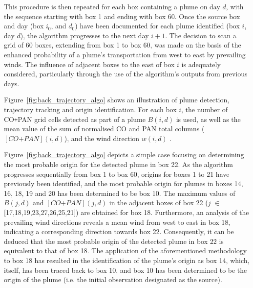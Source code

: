 \documentclass[acp, manuscript]{copernicus}
\begin{document}
This procedure is then repeated for each box containing a plume on day $d$, with the sequence starting with box 1 and ending with box 60. Once the source box and day (box $i_0$, and $d_0$) have been documented for each plume identified (box $i$, day $d$), the algorithm progresses to the next day $i+1$. The decision to scan a grid of 60 boxes, extending from box 1 to box 60, was made on the basis of the enhanced probability of a plume's transportation from west to east by prevailing winds. The influence of adjacent boxes to the east of box $i$ is adequately considered, particularly through the use of the algorithm's outputs from previous days. 



Figure~\ref{fig:back_trajectory_algo} shows an illustration of plume detection, trajectory tracking and origin identification. 
For each box $i$, the number of CO\texttt{+}PAN grid cells detected as part of a plume $B(i,d)$ is used, as well as the mean value of the sum of normalised CO and PAN total columns ($[CO\texttt{+}PAN](i,d)$), and the wind direction $w(i,d)$ . 


Figure~\ref{fig:back_trajectory_algo} depicts a simple case focusing on determining the most probable origin for the detected plume in box 22. As the algorithm progresses sequentially from box 1 to box 60, origins for boxes 1 to 21 have previously been identified, and the most probable origin for plumes in boxes 14, 16, 18, 19 and 20 has been determined to be box 10. The maximum values of $B(j,d)$ and $[CO\texttt{+}PAN](j,d)$ in the adjacent boxes of box 22 ($j$ $\in$ {[17,18,19,23,27,26,25,21]}) are obtained for box 18. Furthermore, an analysis of the prevailing wind directions reveals a mean wind from west to east in box 18, indicating a corresponding direction towards box 22. Consequently, it can be deduced that the most probable origin of the detected plume in box 22 is equivalent to that of box 18. The application of the aforementioned methodology to box 18 has resulted in the identification of the plume's origin as box 14, which, itself, has been traced back to box 10, and box 10 has been determined to be the origin of the plume (i.e. the initial observation designated as the source).
\end{document}
